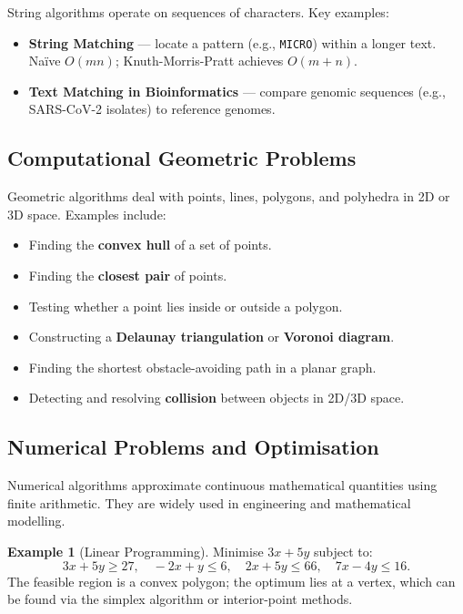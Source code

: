 \documentclass[11pt, a4paper, notitlepage]{report}
\theoremstyle{definition}
\theoremstyle{remark}
\theoremstyle{definition}
\newtheorem{example}[theorem]{Example}
\begin{document}
String algorithms operate on sequences of characters.  Key examples:
\begin{itemize}
  \item \textbf{String Matching} --- locate a pattern (e.g., \texttt{MICRO}) within a longer
        text.  Na\"ive $O(mn)$; Knuth-Morris-Pratt achieves $O(m + n)$.
  \item \textbf{Text Matching in Bioinformatics} --- compare genomic sequences (e.g.,
        SARS-CoV-2 isolates) to reference genomes.
\end{itemize}

\subsection{Computational Geometric Problems}
\label{subsec:geometric-problems}

Geometric algorithms deal with points, lines, polygons, and polyhedra in 2D or 3D space.
Examples include:
\begin{itemize}
  \item Finding the \textbf{convex hull} of a set of points.
  \item Finding the \textbf{closest pair} of points.
  \item Testing whether a point lies inside or outside a polygon.
  \item Constructing a \textbf{Delaunay triangulation} or \textbf{Voronoi diagram}.
  \item Finding the shortest obstacle-avoiding path in a planar graph.
  \item Detecting and resolving \textbf{collision} between objects in 2D/3D space.
\end{itemize}

\subsection{Numerical Problems and Optimisation}
\label{subsec:numerical-problems}

Numerical algorithms approximate continuous mathematical quantities using finite arithmetic.
They are widely used in engineering and mathematical modelling.

\begin{example}[Linear Programming]
\label{ex:linear-programming}
Minimise $3x + 5y$ subject to:
\[
  3x + 5y \geq 27, \quad -2x + y \leq 6, \quad 2x + 5y \leq 66, \quad 7x - 4y \leq 16.
\]
The feasible region is a convex polygon; the optimum lies at a vertex, which can be found via
the simplex algorithm or interior-point methods.
\end{example}
\end{document}
